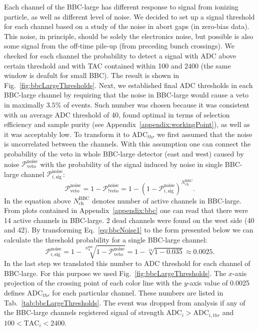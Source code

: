 Each channel of the BBC-large has different response to signal from ionizing particle, as well as different level of noise. We decided to set up a signal threshold for each channel based on a study of the noise in abort gaps (in zero-bias data). This noise, in principle, should be solely the electronics noise, but possible is also some signal from the off-time pile-up (from preceding bunch crossings). We checked for each channel the probability to detect a signal with ADC above certain threshold and with TAC contained within 100 and 2400 (the same window is deafult for small BBC). The result is shown in Fig.~\ref{fig:bbcLargeThresholds}. Next, we established final ADC thresholds in each BBC-large channel by requiring that the noise in BBC-large would cause a veto in maximally $3.5\%$ of events. Such number was chosen because it was consistent with an average ADC threshold of 40, found optimal in terms of selection efficiency and sample purity (see Appendix~\ref{appendix:workingPoint}), as well as it was acceptably low. To transform it to $\text{ADC}_{thr}$ we first assumed that the noise is uncorrelated between the channels. With this assumption one can connect the probability of the veto in whole BBC-large detector (east and west) caused by noise $\mathcal{P}_{\text{veto}}^{\text{noise}}$ with the probability of the signal induced by noise in single BBC-large channel $\mathcal{P}_{i,\text{sig}}^{\text{noise}}$:
\begin{equation}\label{eq:bbcNoise1}
 \mathcal{P}_{\text{veto}}^{\text{noise}} = 1-\mathcal{P}_{!\text{veto}}^{\text{noise}} = 1-\left( 1-\mathcal{P}_{i,\text{sig}}^{\text{noise}} \right)^{N^{\text{BBC}}_{\text{ch}}}.
\end{equation}
In the equation above $N^{\text{BBC}}_{\text{ch}}$ denotes number of active channels in BBC-large. From plots contained in Appendix~\ref{appendix:bbc} one can read that there were 14 active channels in BBC-large. 2 dead channels were found on the west side (40 and 42). By transforming Eq.~\ref{eq:bbcNoise1} to the form presented below we can calculate the threshold probability for a single BBC-large channel:
\begin{equation}\label{eq:bbcNoise2}
 \mathcal{P}_{i,\text{sig}}^{\text{noise}} = 1-\sqrt[N^{\text{BBC}}_{\text{ch}}]{1-\mathcal{P}_{\text{veto}}^{\text{noise}}} = 1-\sqrt[14]{1-0.035} \approx 0.0025.
\end{equation}
In the last step we translated this number to ADC threshold for each channel of BBC-large. For this purpose we used Fig.~\ref{fig:bbcLargeThresholds}. The $x$-axis projection of the crossing point of each color line with the $y$-axis value of 0.0025 defines $\text{ADC}_{thr}$ for each particular channel. These numbers are listed in Tab.~\ref{tab:bbcLargeThresholds}. The event was dropped from analysis if any of the BBC-large channels registered signal of strength $\text{ADC}_{i}>\text{ADC}_{i,thr}$ and $100<\text{TAC}_{i}<2400$.



